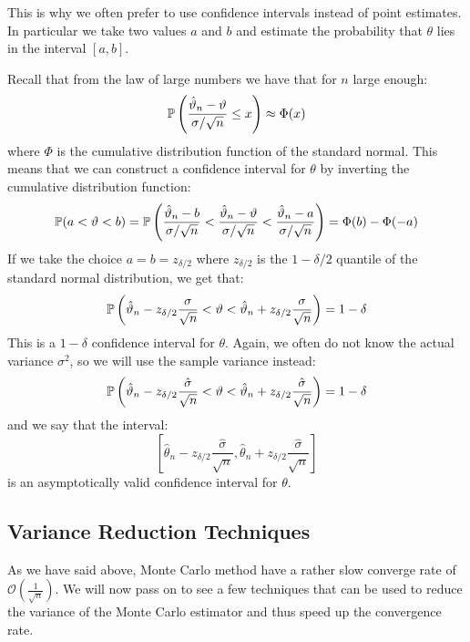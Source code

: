 This is why we often prefer to use confidence intervals instead of point
estimates. In particular we take two values $a$ and $b$ and estimate the
probability that $\theta$ lies in the interval $[a,b]$.

Recall that from the law of large numbers we have that for $n$ large enough:
\[ \P \left( \frac{\hat{\theta}_n - \theta}{\sigma / \sqrt{n}} \leq x \right)
\approx \Phi(x) \]
where $\Phi$ is the cumulative distribution function of the standard normal.
This means that we can construct a confidence interval for $\theta$ by
inverting the cumulative distribution function:
\[ \P(a < \theta < b) = \P \left( \frac{\hat{\theta}_n - b}{\sigma/\sqrt{n}}
< \frac{\hat{\theta}_n-\theta}{\sigma/\sqrt{n}} < \frac{\hat{\theta}_n-a}
{\sigma/\sqrt{n}} \right) = \Phi(b) - \Phi(-a) \]
If we take the choice $a = b = z_{\delta/2}$ where $z_{\delta/2}$ is the
$1-\delta/2$ quantile of the standard normal distribution, we get that:
\[ \P \left( \hat{\theta}_n - z_{\delta/2} \frac{\sigma}{\sqrt{n}} < \theta <
\hat{\theta}_n + z_{\delta/2} \frac{\sigma}{\sqrt{n}} \right) = 1 - \delta \]
This is a $1-\delta$ confidence interval for $\theta$.
Again, we often do not know the actual variance $\sigma^2$, so we will use the
sample variance instead:
\[ \P \left( \hat{\theta}_n - z_{\delta/2} \frac{\hat{\sigma}}{\sqrt{n}} <
\theta < \hat{\theta}_n + z_{\delta/2} \frac{\hat{\sigma}}{\sqrt{n}} \right) =
1 - \delta \]
and we say that the interval:
\[ \left[ \hat{\theta}_n - z_{\delta/2} \frac{\hat{\sigma}}{\sqrt{n}},
\hat{\theta}_n + z_{\delta/2} \frac{\hat{\sigma}}{\sqrt{n}} \right] \]
is an asymptotically valid confidence interval for $\theta$.

\subsection{Variance Reduction Techniques}
As we have said above, Monte Carlo method have a rather slow converge rate of
$\mathcal{O}\left(\frac{1}{\sqrt{n}}\right)$. We will now pass on to see a few
techniques that can be used to reduce the variance of the Monte Carlo estimator
and thus speed up the convergence rate.

